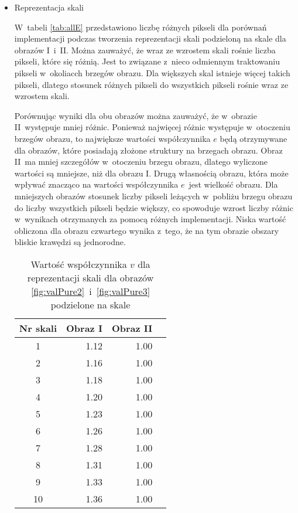 \begin{itemize}
\item{Reprezentacja skali}
\label{subsubsec:reprezentacjaSakliTabele}

W~tabeli \ref{tab:allE} przedstawiono liczbę różnych pikseli dla porównań implementacji podczas tworzenia reprezentacji skali podzieloną na skale dla obrazów I~i~II. Można zauważyć, że wraz ze wzrostem skali rośnie liczba pikseli, które się różnią. Jest to związane z~nieco odmiennym traktowaniu pikseli w~okoliacch brzegów obrazu. Dla większych skal istnieje więcej takich pikseli, dlatego stosunek różnych pikseli do wszystkich pikseli rośnie wraz ze wzrostem skali.

Porównując wyniki dla obu obrazów można zauważyć, że w~obrazie II~występuje mniej różnic. Ponieważ najwięcej różnic występuje w~otoczeniu brzegów obrazu, to największe wartości współczynnika $ e $ będą otrzymywane dla obrazów, które posiadają złożone struktury na brzegach obrazu. Obraz II~ma mniej szczegółów w~otoczeniu brzegu obrazu, dlatego wyliczone wartości są mniejsze, niż dla obrazu I. Drugą własnością obrazu, która może wpływać znacząco na wartości współczynnika $ e $~jest wielkość obrazu. Dla mniejszych obrazów stosunek liczby pikseli leżących w~pobliżu brzegu obrazu do liczby wszystkich pikseli będzie większy, co spowoduje wzrost liczby różnic w~wynikach otrzymanych za pomocą różnych implementacji. Niska wartość obliczona dla obrazu czwartego wynika z~tego, że na tym obrazie obszary bliskie krawędzi są jednorodne.

\begin{center}
\begin{table}
\centering
\caption{Wartość współczynnika $ v $ dla reprezentacji skali dla obrazów \ref{fig:valPure2}~i~\ref{fig:valPure3} podzielone na skale}
\label{tab:allV}
\begin{tabular}{|c|r|r|r|}
\hline
Nr skali & Obraz I  &  Obraz II\\ \hline
1        & 1.12     & 1.00\\ \hline
2        & 1.16     & 1.00\\ \hline
3        & 1.18     & 1.00\\ \hline
4        & 1.20     & 1.00\\ \hline
5        & 1.23     & 1.00\\ \hline
6        & 1.26     & 1.00\\ \hline
7        & 1.28     & 1.00\\ \hline
8        & 1.31     & 1.00\\ \hline
9        & 1.33     & 1.00\\ \hline
10       & 1.36     & 1.00\\ \hline
\end{tabular}
\end{table}
\end{center}


\end{itemize}
